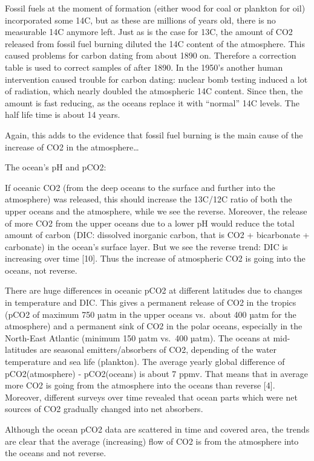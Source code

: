 \documentclass[
]{book}
\begin{document}
Fossil fuels at the moment of formation (either wood for coal or plankton for oil) incorporated some 14C, but as these are millions of years old, there is no measurable 14C anymore left. Just as is the case for 13C, the amount of CO2 released from fossil fuel burning diluted the 14C content of the atmosphere. This caused problems for carbon dating from about 1890 on. Therefore a correction table is used to correct samples of after 1890. In the 1950's another human intervention caused trouble for carbon dating: nuclear bomb testing induced a lot of radiation, which nearly doubled the atmospheric 14C content. Since then, the amount is fast reducing, as the oceans replace it with ``normal'' 14C levels. The half life time is about 14 years.

Again, this adds to the evidence that fossil fuel burning is the main cause of the increase of CO2 in the atmosphere\ldots{}

The ocean's pH and pCO2:

If oceanic CO2 (from the deep oceans to the surface and further into the atmosphere) was released, this should increase the 13C/12C ratio of both the upper oceans and the atmosphere, while we see the reverse. Moreover, the release of more CO2 from the upper oceans due to a lower pH would reduce the total amount of carbon (DIC: dissolved inorganic carbon, that is CO2 + bicarbonate + carbonate) in the ocean's surface layer. But we see the reverse trend: DIC is increasing over time {[}10{]}. Thus the increase of atmospheric CO2 is going into the oceans, not reverse.

There are huge differences in oceanic pCO2 at different latitudes due to changes in temperature and DIC. This gives a permanent release of CO2 in the tropics (pCO2 of maximum 750 µatm in the upper oceans vs.~about 400 µatm for the atmosphere) and a permanent sink of CO2 in the polar oceans, especially in the North-East Atlantic (minimum 150 µatm vs.~400 µatm). The oceans at mid-latitudes are seasonal emitters/absorbers of CO2, depending of the water temperature and sea life (plankton). The average yearly global difference of pCO2(atmosphere) - pCO2(oceans) is about 7 ppmv. That means that in average more CO2 is going from the atmosphere into the oceans than reverse {[}4{]}. Moreover, different surveys over time revealed that ocean parts which were net sources of CO2 gradually changed into net absorbers.

Although the ocean pCO2 data are scattered in time and covered area, the trends are clear that the average (increasing) flow of CO2 is from the atmosphere into the oceans and not reverse.
\end{document}
